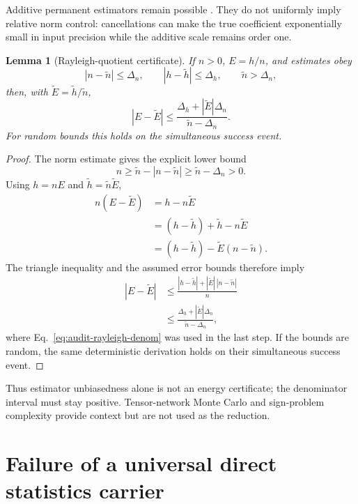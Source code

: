 \documentclass[aps,pra,reprint,superscriptaddress,nofootinbib,longbibliography,showkeys]{revtex4-2}
\newtheorem{lemma}[theorem]{Lemma}
\theoremstyle{definition}
\begin{document}
Additive permanent estimators remain possible
\cite{AaronsonHance2014Gurvits}.  They do not uniformly imply relative norm
control: cancellations can make the true coefficient exponentially small in
input precision while the additive scale remains order one.

\begin{lemma}[Rayleigh-quotient certificate]
If $n>0$, $E=h/n$, and estimates obey
\[
 |n-\widetilde n|\le\Delta_n,\qquad
 |h-\widetilde h|\le\Delta_h,\qquad
 \widetilde n>\Delta_n,
\]
then, with $\widetilde E=\widetilde h/\widetilde n$,
\[
 |E-\widetilde E|\le
 \frac{\Delta_h+|\widetilde E|\Delta_n}
 {\widetilde n-\Delta_n}.
\]
For random bounds this holds on the simultaneous success event.
\end{lemma}

\begin{proof}
The norm estimate gives the explicit lower bound
\begin{equation}
n\ge\widetilde n-|n-\widetilde n|
\ge\widetilde n-\Delta_n>0.
\label{eq:audit-rayleigh-denom}
\end{equation}
Using $h=nE$ and $\widetilde h=\widetilde n\widetilde E$,
\begin{align}
n(E-\widetilde E)
&=h-n\widetilde E\nonumber\\
&=(h-\widetilde h)+\widetilde h-n\widetilde E\nonumber\\
&=(h-\widetilde h)-\widetilde E(n-\widetilde n).
\end{align}
The triangle inequality and the assumed error bounds therefore imply
\begin{align}
|E-\widetilde E|
&\le\frac{|h-\widetilde h|+|\widetilde E|\,|n-\widetilde n|}{n}\nonumber\\
&\le\frac{\Delta_h+|\widetilde E|\Delta_n}
{\widetilde n-\Delta_n},
\end{align}
where Eq.~\eqref{eq:audit-rayleigh-denom} was used in the last step.  If the
bounds are random, the same deterministic derivation holds on their
simultaneous success event.
\end{proof}

Thus estimator unbiasedness alone is not an energy certificate; the
denominator interval must stay positive.  Tensor-network Monte Carlo
\cite{Ferris2015TNMC} and sign-problem complexity
\cite{TroyerWiese2005SignProblem} provide context but are not used as the
reduction.

\section{Failure of a universal direct statistics carrier}
\end{document}
